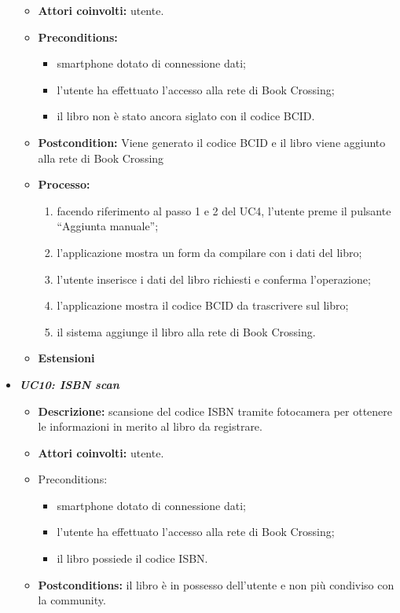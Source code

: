 \begin{itemize}
\begin{itemize}
		\item \textbf{Attori coinvolti:} utente.
		\item \textbf{Preconditions:}
		\begin{itemize}
			\item smartphone dotato di connessione dati;
			\item l’utente ha effettuato l’accesso alla rete di Book Crossing;
			\item il libro non è stato ancora siglato con il codice BCID.
		\end{itemize}
		\item \textbf{Postcondition:} Viene generato il codice BCID e il libro viene aggiunto alla rete di Book Crossing
		\item \textbf{Processo: }
		\begin{enumerate}
			\item facendo riferimento al passo 1 e 2 del UC4, l'utente preme il pulsante “Aggiunta manuale”;
			\item l’applicazione mostra un form da compilare con i dati del libro;
			\item l’utente inserisce i dati del libro richiesti e conferma l’operazione;
			\item l’applicazione mostra il codice BCID da trascrivere sul libro;
			\item il sistema aggiunge il libro alla rete di Book Crossing.
		\end{enumerate}
		\item \textbf{Estensioni}
	\end{itemize}
	\item \textbf{\textit{UC10: ISBN scan}} \label{itemize:UC10}
	\begin{itemize}
		\item \textbf{Descrizione:} scansione del codice ISBN tramite fotocamera per ottenere le informazioni in merito al libro da registrare.
		\item \textbf{Attori coinvolti:} utente.
		\item {Preconditions:} 
		\begin{itemize}
			\item smartphone dotato di connessione dati;
			\item l’utente ha effettuato l’accesso alla rete di Book Crossing;
			\item il libro possiede il codice ISBN.
		\end{itemize}
		\item \textbf{Postconditions:} il libro è in possesso dell'utente e non più condiviso con la community.

\end{itemize}
\end{itemize}
